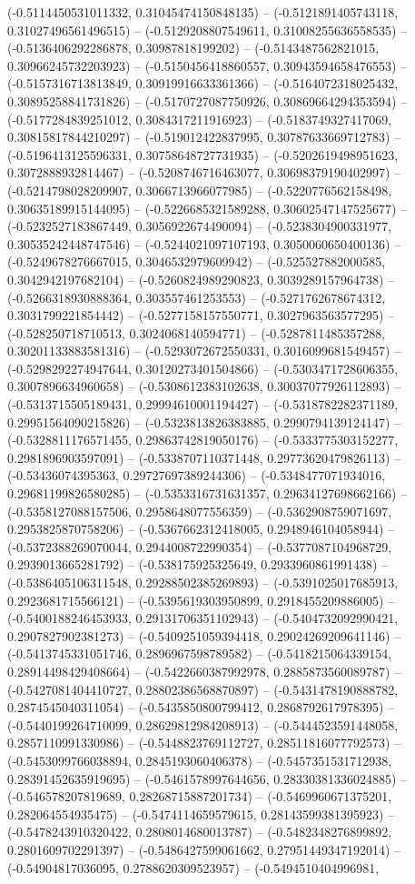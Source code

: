 (-0.5114450531011332, 0.31045474150848135) -- (-0.5121891405743118, 0.31027496561496515) -- (-0.5129208807549611, 0.31008255636558535) -- (-0.5136406292286878, 0.30987818199202) -- (-0.5143487562821015, 0.30966245732203923) -- (-0.5150456418860557, 0.30943594658476553) -- (-0.5157316713813849, 0.30919916633361366) -- (-0.5164072318025432, 0.30895258841731826) -- (-0.5170727087750926, 0.30869664294353594) -- (-0.5177284839251012, 0.3084317211916923) -- (-0.5183749327417069, 0.30815817844210297) -- (-0.519012422837995, 0.30787633669712783) -- (-0.5196413125596331, 0.30758648727731935) -- (-0.5202619498951623, 0.3072888932814467) -- (-0.5208746716463077, 0.30698379190402997) -- (-0.5214798028209907, 0.3066713966077985) -- (-0.5220776562158498, 0.30635189915144095) -- (-0.5226685321589288, 0.30602547147525677) -- (-0.5232527183867449, 0.3056922674490094) -- (-0.5238304900331977, 0.30535242448747546) -- (-0.5244021097107193, 0.3050060650400136) -- (-0.5249678276667015, 0.3046532979609942) -- (-0.525527882000585, 0.3042942197682104) -- (-0.5260824989290823, 0.3039289157964738) -- (-0.5266318930888364, 0.303557461253553) -- (-0.5271762678674312, 0.3031799221854442) -- (-0.5277158157550771, 0.3027963563577295) -- (-0.528250718710513, 0.3024068140594771) -- (-0.5287811485357288, 0.30201133883581316) -- (-0.5293072672550331, 0.3016099681549457) -- (-0.5298292274947644, 0.30120273401504866) -- (-0.5303471728606355, 0.3007896634960658) -- (-0.5308612383102638, 0.30037077926112893) -- (-0.5313715505189431, 0.29994610001194427) -- (-0.5318782282371189, 0.29951564090215826) -- (-0.5323813826383885, 0.2990794139124147) -- (-0.5328811176571455, 0.29863742819050176) -- (-0.5333775303152277, 0.2981896903597091) -- (-0.5338707110371448, 0.29773620479826113) -- (-0.53436074395363, 0.29727697389244306) -- (-0.5348477071934016, 0.29681199826580285) -- (-0.5353316731631357, 0.29634127698662166) -- (-0.5358127088157506, 0.2958648077556359) -- (-0.5362908759071697, 0.2953825870758206) -- (-0.5367662312418005, 0.2948946104058944) -- (-0.5372388269070044, 0.2944008722990354) -- (-0.5377087104968729, 0.2939013665281792) -- (-0.538175925325649, 0.2933960861991438) -- (-0.5386405106311548, 0.29288502385269893) -- (-0.5391025017685913, 0.2923681715566121) -- (-0.5395619303950899, 0.2918455209886005) -- (-0.5400188246453933, 0.29131706351102943) -- (-0.5404732092990421, 0.2907827902381273) -- (-0.5409251059394418, 0.29024269209641146) -- (-0.5413745331051746, 0.2896967598789582) -- (-0.5418215064339154, 0.28914498429408664) -- (-0.5422660387992978, 0.2885873560089787) -- (-0.5427081404410727, 0.28802386568870897) -- (-0.5431478190888782, 0.2874545040311054) -- (-0.5435850800799412, 0.2868792617978395) -- (-0.5440199264710099, 0.28629812984208913) -- (-0.5444523591448058, 0.2857110991330986) -- (-0.5448823769112727, 0.28511816077792573) -- (-0.5453099766038894, 0.2845193060406378) -- (-0.5457351531712938, 0.28391452635919695) -- (-0.5461578997644656, 0.28330381336024885) -- (-0.546578207819689, 0.28268715887201734) -- (-0.5469960671375201, 0.282064554935475) -- (-0.5474114659579615, 0.28143599381395923) -- (-0.5478243910320422, 0.2808014680013787) -- (-0.5482348276899892, 0.2801609702291397) -- (-0.5486427599061662, 0.27951449347192014) -- (-0.54904817036095, 0.2788620309523957) -- (-0.5494510404996981, 
